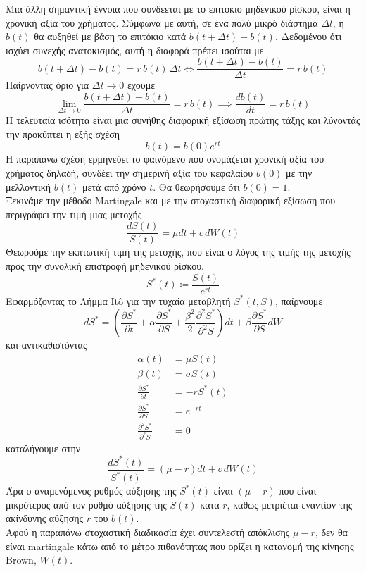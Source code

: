 \documentclass[12pt,a4paper,twoside,openany]{book}
\begin{document}
 	\vspace{2.5mm}
 	Μια άλλη σημαντική έννοια που συνδέεται με το επιτόκιο μηδενικού ρίσκου, είναι η χρονική αξία του χρήματος. Σύμφωνα με αυτή, σε ένα πολύ μικρό διάστημα $\Delta t$, η $b(t)$ θα αυξηθεί με βάση το επιτόκιο κατά $b(t+\Delta t)- b(t)$. Δεδομένου ότι ισχύει συνεχής ανατοκισμός, αυτή η διαφορά πρέπει ισούται με \[b(t+\Delta t)- b(t)= r\, b(t)\, \Delta t \iff \frac{b(t+\Delta t)- b(t)}{\Delta t} = r\, b(t) \]
 	Παίρνοντας όριο για $\Delta t \rightarrow0$ έχουμε
 	\[\lim_{\Delta t \rightarrow0}  \frac{b(t+\Delta t)- b(t)}{\Delta t}= r\, b(t) \implies \frac{db(t)}{dt}= r\, b(t) \]
 	Η τελευταία ισότητα είναι μια συνήθης διαφορική εξίσωση πρώτης τάξης και λύνοντάς την προκύπτει η εξής σχέση
 	\[b(t)= b(0)e^{rt} \label{MoneyValue} \tag{3.1.0}\]
 	Η παραπάνω σχέση ερμηνεύει το φαινόμενο που ονομάζεται χρονική αξία του χρήματος δηλαδή, συνδέει την σημερινή αξία του κεφαλαίου $b(0)$ με την μελλοντική $b(t)$ μετά από χρόνο $t$. Θα θεωρήσουμε ότι $b(0)=1$.
 	\vspace{4.5mm}\\
 	Ξεκινάμε την μέθοδο Martingale και με την στοχαστική διαφορική εξίσωση που περιγράφει την τιμή μιας μετοχής
 	\[ \frac{dS(t)}{S(t)}= \mu dt + \sigma dW(t) \label{StockValueSDE}\tag{3.1.1} \] 	
 	Θεωρούμε την εκπτωτική τιμή της μετοχής, που είναι ο λόγος της τιμής της μετοχής προς την συνολική επιστροφή μηδενικού ρίσκου.
 	\[S^*(t)\coloneqq \frac{S(t)}{e^{rt}}\]
 	Εφαρμόζοντας το Λήμμα Itô για την τυχαία μεταβλητή $S^*(t,S)$, παίρνουμε
 	\[dS^*= \left(\frac{\partial S^*}{\partial t} +\alpha\frac{\partial S^*}{\partial S} + \frac{\beta^2}{2}\frac{\partial^2 S^*}{\partial^2 S} \right)dt
 	+ \beta\frac{\partial S^*}{\partial S}dW \]
 	και αντικαθιστόντας
 	\begingroup
 	\allowdisplaybreaks
 	\begin{align*}
 		\alpha(t) &= \mu S(t) \\
 		\beta(t) &= \sigma S(t) \\
 		\frac{\partial S^*}{\partial t} &= -rS^*(t) \\
 		\frac{\partial S^*}{\partial S} &= e^{-rt} \\ 
 		\frac{\partial^2 S^*}{\partial^2 S}	&= 0	
 	\end{align*}
 	καταλήγουμε στην
    \[\frac{dS^*(t)}{S^*(t)}= (\mu-r) dt + \sigma dW(t) \label{S*SDE}\tag{3.1.2}\]
    Άρα ο αναμενόμενος ρυθμός αύξησης της $S^*(t)$ είναι $(\mu -r)$ που είναι μικρότερος από τον ρυθμό αύξησης της $S(t)$ κατα $r$, καθώς μετριέται εναντίον της ακίνδυνης αύξησης $r$ του $b(t)$.\\ Αφού η παραπάνω στοχαστική διαδικασία έχει συντελεστή απόκλισης $\mu-r$, δεν θα είναι martingale κάτω από το μέτρο πιθανότητας που ορίζει η κατανομή της κίνησης Brown, $W(t)$.
\end{document}
